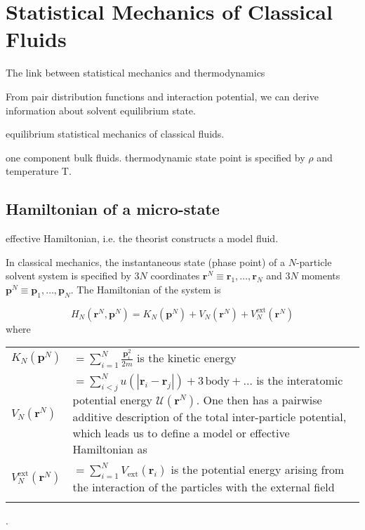 
\chapter{Statistical Mechanics of Classical Fluids \label{chpt:statistical-mechanics}}

The link between statistical mechanics and thermodynamics

From pair distribution functions and interaction potential, we can
derive information about solvent equilibrium state.

equilibrium statistical mechanics of classical fluids.

one component bulk fluids. thermodynamic state point is specified
by $\rho$ and temperature T. 


\section{Hamiltonian of a micro-state}

effective Hamiltonian, i.e. the theorist constructs a model fluid. 

In classical mechanics, the instantaneous state (phase point) of a
$N$-particle solvent system is specified by $3N$ coordinates $\mathbf{r}^{N}\equiv\mathbf{r}_{1},\ldots,\mathbf{r}_{N}$
and $3N$ moments $\mathbf{p}^{N}\equiv\mathbf{p}_{1},\ldots,\mathbf{p}_{N}$.
The Hamiltonian of the system is

\begin{equation}
H_{N}(\mathbf{r}^{N},\mathbf{p}^{N})=K_{N}(\mathbf{p}^{N})+V_{N}(\mathbf{r}^{N})+V_{N}^{\mathrm{ext}}(\mathbf{r}^{N})
\end{equation}
where

\begin{tabular}{ll}
$K_{N}(\mathbf{p}^{N})$ & $={\displaystyle \sum_{i=1}^{N}\frac{\mathbf{p}_{i}^{2}}{2m}}$ is
the kinetic energy \tabularnewline
$V_{N}(\mathbf{r}^{N})$ & $={\displaystyle \sum_{i<j}^{N}u(\left|\mathbf{r}_{i}-\mathbf{r}_{j}\right|)+3\,\mathrm{body}+\ldots}$
is the interatomic potential energy $\mathcal{U}(\mathbf{r}^{N})$.
One then has a pairwise additive description of the total inter-particle
potential, which leads us to define a model or effective Hamiltonian
as\tabularnewline
$V_{N}^{\mathrm{ext}}(\mathbf{r}^{N})$ & $={\displaystyle \sum_{i=1}^{N}}V_{\mathrm{ext}}(\mathbf{r}_{i})$
is the potential energy arising from the interaction of the particles
with the external field\tabularnewline
 & \tabularnewline
\end{tabular}.

